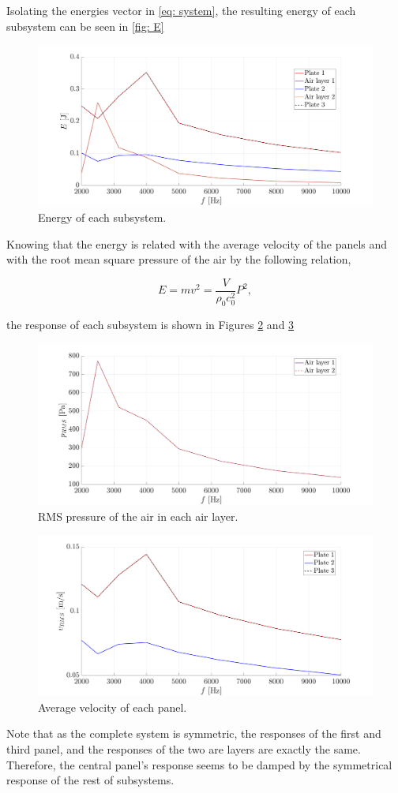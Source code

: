 Isolating the energies vector in \autoref{eq: system}, the resulting energy of each subsystem can be seen in \autoref{fig: E}

\begin{figure}[H]
    \centering
    \includegraphics[width=0.9\linewidth]{Figures/E.png}
    \caption{Energy of each subsystem.}
    \label{fig: E}
\end{figure}

Knowing that the energy is related with the average velocity of the panels and with the root mean square pressure of the air  by the following relation,

\begin{equation}
    E = m v^2 = \frac{V}{\rho_0 c_0^2} P^2,
\end{equation}

the response of each subsystem is shown in Figures \ref{fig: pRMS} and \ref{fig: vRMS}
\begin{figure}[H]
    \centering
    \includegraphics[width=0.9\linewidth]{Figures/pRMS.png}
    \caption{RMS pressure of the air in each air layer.}
    \label{fig: pRMS}
\end{figure}
\begin{figure}[H]
    \centering
    \includegraphics[width=0.9\linewidth]{Figures/vRMS.png}
    \caption{Average velocity of each panel.}
    \label{fig: vRMS}
\end{figure}

Note that as the complete system is symmetric, the responses of the first and third panel, and the responses of the two are layers are exactly the same. Therefore, the central panel's response seems to be damped by the symmetrical response of the rest of subsystems. 
